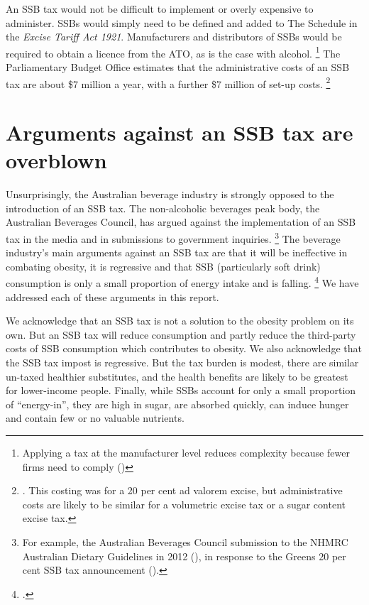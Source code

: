 \documentclass[embargoed]{grattan}
\begin{document}
An SSB tax would not be difficult to implement or overly expensive to administer.
SSBs would simply need to be defined and added to The Schedule in the \emph{Excise Tariff Act 1921}.
Manufacturers and distributors of SSBs would be required to obtain a licence from the ATO, as is the case with alcohol.%
\footnote{Applying a tax at the manufacturer level reduces complexity because fewer firms need to comply (\textcites{CnossenExcisetaxationAustralia}{Freebairn2010Taxationobesity})} The Parliamentary Budget Office estimates that the administrative costs of an SSB tax are about \$7 million a year, with a further \$7 million of set-up costs.%
\footnote{\textcite{Office2016PolicycostingAustralian}.
This costing was for a 20 per cent ad valorem excise, but administrative costs are likely to be similar for a volumetric excise tax or a sugar content excise tax.}


\section{Arguments against an SSB tax are overblown}\label{arguments-against-an-ssb-tax-are-overblown}

Unsurprisingly, the Australian beverage industry is strongly opposed to the introduction of an SSB tax.
The non-alcoholic beverages peak body, the Australian Beverages Council, has argued against the implementation of an SSB tax in the media and in submissions to government inquiries.%
\footnote{For example, the Australian Beverages Council submission to the NHMRC Australian Dietary Guidelines in 2012 (\textcite{Council2012AustralianBeveragesCouncil}), in response to the Greens 20 per cent SSB tax announcement (\textcite{Council2016Softdrinktax}).} The beverage industry's main arguments against an SSB tax are that it will be ineffective in combating obesity, it is regressive and that SSB (particularly soft drink) consumption is only a small proportion of energy intake and is falling.%
\footcite{Sharma2014effectstaxingsugarsweetened} We have addressed each of these arguments in this report. 

We acknowledge that an SSB tax is not a solution to the obesity problem on its own.
But an SSB tax will reduce consumption and partly reduce the third-party costs of SSB consumption which contributes to obesity.
We also acknowledge that the SSB tax impost is regressive.
But the tax burden is modest, there are similar un-taxed healthier substitutes, and the health benefits are likely to be greatest for lower-income people.
Finally, while SSBs account for only a small proportion of “energy-in”, they are high in sugar, are absorbed quickly, can induce hunger and contain few or no valuable nutrients.
\end{document}
